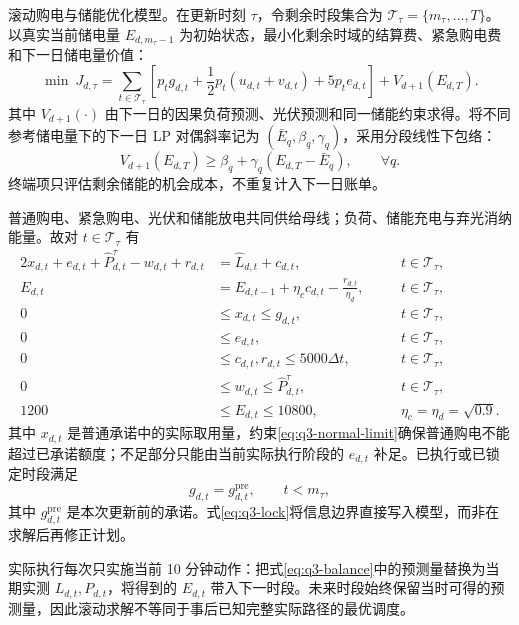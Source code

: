 \noindent 滚动购电与储能优化模型。在更新时刻 $\tau$，令剩余时段集合为 $\mathcal T_\tau=\{m_\tau,\ldots,T\}$。以真实当前储电量 $E_{d,m_\tau-1}$ 为初始状态，最小化剩余时域的结算费、紧急购电费和下一日储电量价值：
\begin{equation}
\min\ J_{d,\tau}=\sum_{t\in\mathcal T_\tau}\left[p_tg_{d,t}+\frac12p_t(u_{d,t}+v_{d,t})+5p_te_{d,t}\right]+V_{d+1}(E_{d,T}).
\label{eq:q3-objective}
\end{equation}
其中 $V_{d+1}(\cdot)$ 由下一日的因果负荷预测、光伏预测和同一储能约束求得。将不同参考储电量下的下一日 LP 对偶斜率记为 $(\bar E_q,\beta_q,\gamma_q)$，采用分段线性下包络：
\begin{equation}
V_{d+1}(E_{d,T})\geq \beta_q+\gamma_q(E_{d,T}-\bar E_q),\qquad \forall q.
\label{eq:q3-terminal-value}
\end{equation}
终端项只评估剩余储能的机会成本，不重复计入下一日账单。

普通购电、紧急购电、光伏和储能放电共同供给母线；负荷、储能充电与弃光消纳能量。故对 $t\in\mathcal T_\tau$ 有
\begin{alignat}{2}
x_{d,t}+e_{d,t}+\widehat P_{d,t}^{\tau}-w_{d,t}+r_{d,t}&=\widehat L_{d,t}+c_{d,t}, &&\quad t\in\mathcal T_\tau,\label{eq:q3-balance}\\
E_{d,t}&=E_{d,t-1}+\eta_c c_{d,t}-\frac{r_{d,t}}{\eta_d}, &&\quad t\in\mathcal T_\tau,\label{eq:q3-soc}\\
0&\le x_{d,t}\le g_{d,t}, &&\quad t\in\mathcal T_\tau,\nonumber\\[-2pt]
0&\le e_{d,t}, &&\quad t\in\mathcal T_\tau,\label{eq:q3-normal-limit}\\
0&\le c_{d,t},r_{d,t}\le5000\Delta t, &&\quad t\in\mathcal T_\tau,\nonumber\\[-2pt]
0&\le w_{d,t}\le\widehat P_{d,t}^{\tau}, &&\quad t\in\mathcal T_\tau,\label{eq:q3-power-limit}\\
1200&\le E_{d,t}\le10800, &&\quad \eta_c=\eta_d=\sqrt{0.9}.\label{eq:q3-soc-limit}
\end{alignat}
其中 $x_{d,t}$ 是普通承诺中的实际取用量，约束\eqref{eq:q3-normal-limit}确保普通购电不能超过已承诺额度；不足部分只能由当前实际执行阶段的 $e_{d,t}$ 补足。已执行或已锁定时段满足
\begin{equation}
g_{d,t}=g_{d,t}^{\mathrm{pre}},\qquad t<m_\tau,
\label{eq:q3-lock}
\end{equation}
其中 $g_{d,t}^{\mathrm{pre}}$ 是本次更新前的承诺。式\eqref{eq:q3-lock}将信息边界直接写入模型，而非在求解后再修正计划。

实际执行每次只实施当前 10 分钟动作：把式\eqref{eq:q3-balance}中的预测量替换为当期实测 $L_{d,t},P_{d,t}$，将得到的 $E_{d,t}$ 带入下一时段。未来时段始终保留当时可得的预测量，因此滚动求解不等同于事后已知完整实际路径的最优调度。

